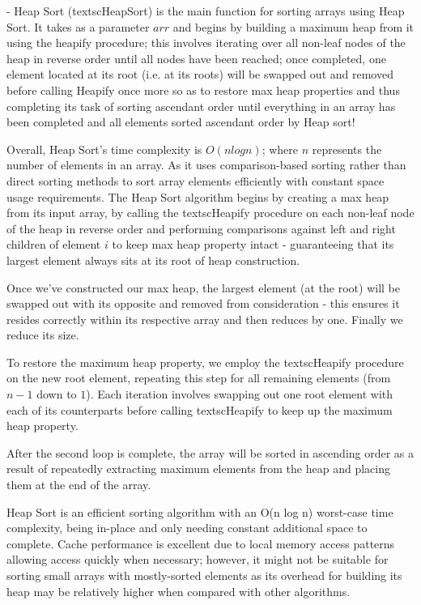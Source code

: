 \documentclass{article}
\begin{document}
- Heap Sort (textscHeapSort) is the main function for sorting arrays using Heap Sort. It takes as a parameter $arr$ and begins by building a maximum heap from it using the heapify procedure; this involves iterating over all non-leaf nodes of the heap in reverse order until all nodes have been reached; once completed, one element located at its root (i.e. at its roots) will be swapped out and removed before calling Heapify once more so as to restore max heap properties and thus completing its task of sorting ascendant order until everything in an array has been completed and all elements sorted ascendant order by Heap sort!

Overall, Heap Sort's time complexity is $O(n log n)$; where $n$ represents the number of elements in an array. As it uses comparison-based sorting rather than direct sorting methods to sort array elements efficiently with constant space usage requirements.
The Heap Sort algorithm begins by creating a max heap from its input array, by calling the textscHeapify procedure on each non-leaf node of the heap in reverse order and performing comparisons against left and right children of element $i$ to keep max heap property intact - guaranteeing that its largest element always sits at its root of heap construction.

Once we've constructed our max heap, the largest element (at the root) will be swapped out with its opposite and removed from consideration - this ensures it resides correctly within its respective array and then reduces by one. Finally we reduce its size.

To restore the maximum heap property, we employ the textscHeapify procedure on the new root element, repeating this step for all remaining elements (from $n-1$ down to $1$). Each iteration involves swapping out one root element with each of its counterparts before calling textscHeapify to keep up the maximum heap property.

After the second loop is complete, the array will be sorted in ascending order as a result of repeatedly extracting maximum elements from the heap and placing them at the end of the array.

Heap Sort is an efficient sorting algorithm with an O(n log n) worst-case time complexity, being in-place and only needing constant additional space to complete. Cache performance is excellent due to local memory access patterns allowing access quickly when necessary; however, it might not be suitable for sorting small arrays with mostly-sorted elements as its overhead for building its heap may be relatively higher when compared with other algorithms.
\end{document}
